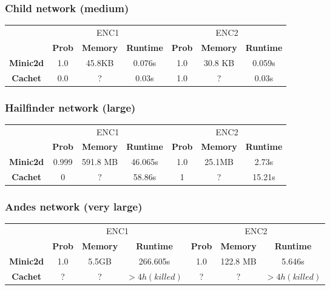 \subsubsection{Child network (medium)}
\begin{table}[H]
    \centering
    \begin{tabular}{c|c|c|c|c|c|c|}
    \cline{2-7}
            & \multicolumn{3}{c|}{ENC1} & \multicolumn{3}{c|}{ENC2} \\ \cline{2-7}
      & \textbf{Prob}  & \textbf{Memory}  & \textbf{Runtime} & \textbf{Prob}  & \textbf{Memory}  & \textbf{Runtime} \\ \cline{1-7}
      \textbf{Minic2d} & 1.0  & 45.8KB    & 0.076s   & 1.0    & 30.8 KB    & 	0.059s \\
      \hline
    \textbf{Cachet}  & 0.0  & ?    & 0.03s      & 1.0     & ?    & 0.03s    \\ \cline{1-7}
    \end{tabular}
\end{table}

\subsubsection{Hailfinder network (large)}
\begin{table}[H]
    \centering
    \begin{tabular}{c|c|c|c|c|c|c|}
    \cline{2-7}
            & \multicolumn{3}{c|}{ENC1} & \multicolumn{3}{c|}{ENC2} \\ \cline{2-7}
      & \textbf{Prob}  & \textbf{Memory}  & \textbf{Runtime} & \textbf{Prob}  & \textbf{Memory}  & \textbf{Runtime} \\ \cline{1-7}
      \textbf{Minic2d} & 0.999  & 591.8 MB & 46.065s   & 1.0    & 25.1MB    & 	2.73s \\
      \hline
    \textbf{Cachet}  & 0  & ?    & 58.86s       & 1     & ?    & 15.21s    \\ \cline{1-7}
    \end{tabular}
\end{table}

\subsubsection{Andes network (very large)}
\begin{table}[H]
    \centering
    \begin{tabular}{c|c|c|c|c|c|c|}
    \cline{2-7}
            & \multicolumn{3}{c|}{ENC1} & \multicolumn{3}{c|}{ENC2} \\ \cline{2-7}
      & \textbf{Prob}  & \textbf{Memory}  & \textbf{Runtime} & \textbf{Prob}  & \textbf{Memory}  & \textbf{Runtime} \\ \cline{1-7}
      \textbf{Minic2d} & 1.0  & 5.5GB    & 266.605s   & 1.0    & 122.8 MB    & 	5.646s \\
      \hline
    \textbf{Cachet}  & ?  & ?    & $ > 4h (killed) $      & ?     & ?    & $ > 4h (killed) $     \\ \cline{1-7}
    \end{tabular}
\end{table}

